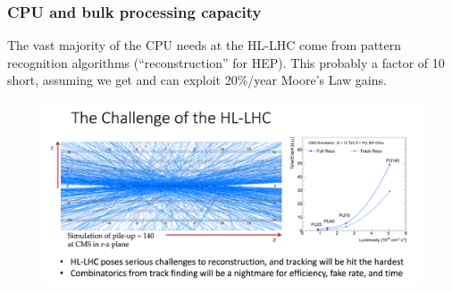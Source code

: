 \begin{frame}
\frametitle{CPU and bulk processing capacity}

The vast majority of the CPU needs at the HL-LHC come from pattern recognition algorithms (``reconstruction'' for HEP). This probably a factor of 10 short, assuming we get and can exploit 20\%/year Moore's Law gains.

\begin{figure}[htbp]
\begin{center}
\includegraphics[width=1.0\textwidth]{images/hllhc-reco-tracking.png}
\end{center}
\end{figure}

\end{frame}


